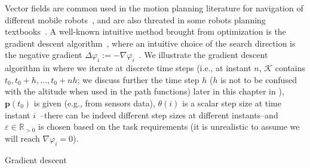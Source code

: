 Vector fields are common used in the motion planning literature for navigation of different mobile robots~\citep{lindemann2005smoothly,gonccalves2010vector,panagou2014motion,zhou2014vector,kapitanyuk2017guiding,de2017guidance}, and are also threated in some robots planning textbooks~\citep{choset2005principles,lavalle2006planning}. A well-known intuitive method brought from optimization is the gradient descent algorithm~\citep{choset2005principles,bryson1975applied}, where an intuitive choice of the search direction is the negative gradient $\Delta \varphi_i:=-\nabla\varphi_i$~\citep{boyd2004convex}. We illustrate the gradient descent algorithm in  where we iterate at discrete time steps (i.e., at instant $n$, $\mathcal{K}$ contains $t_0,t_0+h,\dots,t_0+nh$; we discuss further the time step $h$ ($h$ is not to be confused with the altitude when used in the path functions) later in this chapter in ), $\mathbf{p}(t_0)$ is given (e.g., from sensors data), $\theta(i)$ is a scalar step size at time instant $i$~\citep{choset2005principles}--there can be indeed different step sizes at different instants--and $\varepsilon\in\mathbb{R}_{>0}$ is chosen based on the task requirements (it is unrealistic to assume we will reach $\nabla\varphi_i=0$).

\begin{algorithm}[h!] %

  \DontPrintSemicolon
  \vspace{.8ex}

  \vspace{.8ex}

  \caption{Gradient descent}
  \label{algo:grad-desc}
\end{algorithm}

